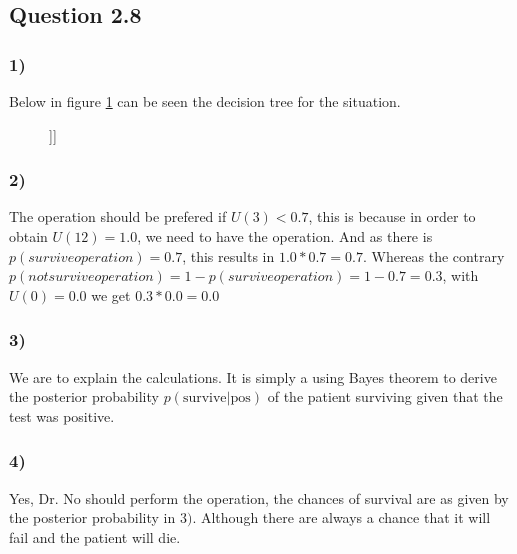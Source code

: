 \subsection*{Question 2.8}
\subsubsection*{1)}
Below in figure \ref{fig:q28decisiontree} can be seen the decision
tree for the situation.

\begin{figure}[!htbp]
  \centering
  \synttree[\fbox{{}\quad{}} [No operation, $U(3)$\quad {}][\setlength{\unitlength}{0.5mm} \begin{picture}(1, 1) \put(-1,3){\circle{8}} \end{picture}[Live, $p=\frac{7}{10}$, $U(12)$][Die, $p = \frac{3}{10}$, $U(0)$]]]
  \caption{}
  \label{fig:q28decisiontree}
\end{figure}

\subsubsection*{2)}
The operation should be prefered if $U(3) < 0.7$, this is because in
order to obtain $U(12) = 1.0$, we need to have the operation. And as
there is $p(survive operation) = 0.7$, this results in $1.0 * 0.7 =
0.7$. Whereas the contrary $p(not survive operation) = 1 - p(survive
operation) = 1 - 0.7 = 0.3$, with $U(0) = 0.0$ we get $0.3 * 0.0 =
0.0$

\subsubsection*{3)}
We are to explain the calculations. It is simply a using Bayes theorem
to derive the posterior probability $p(\textrm{survive}|\textrm{pos})$
of the patient surviving given that the test was positive.

\subsubsection*{4)}
Yes, Dr. No should perform the operation, the chances of survival are
as given by the posterior probability in $3)$. Although there are
always a chance that it will fail and the patient will die.
